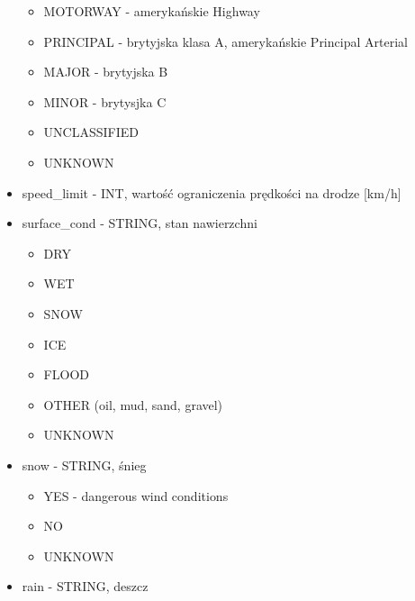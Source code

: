\begin{itemize}
  \begin{itemize}
  \itemsep1pt\parskip0pt
  \item
    MOTORWAY - amerykańskie Highway\\
  \item
    PRINCIPAL - brytyjska klasa A, amerykańskie Principal Arterial\\
  \item
    MAJOR - brytyjska B\\
  \item
    MINOR - brytysjka C\\
  \item
    UNCLASSIFIED\\
  \item
    UNKNOWN\\
  \end{itemize}
\item
  speed\_limit - INT, wartość ograniczenia prędkości na drodze
  {[}km/h{]}\\
\item
  surface\_cond - STRING, stan nawierzchni

  \begin{itemize}
  \itemsep1pt\parskip0pt
  \item
    DRY\\
  \item
    WET\\
  \item
    SNOW\\
  \item
    ICE\\
  \item
    FLOOD\\
  \item
    OTHER (oil, mud, sand, gravel)\\
  \item
    UNKNOWN\\
  \end{itemize}
\item
  snow - STRING, śnieg

  \begin{itemize}
  \itemsep1pt\parskip0pt
  \item
    YES - dangerous wind conditions\\
  \item
    NO\\
  \item
    UNKNOWN\\
  \end{itemize}
\item
  rain - STRING, deszcz


\end{itemize}
